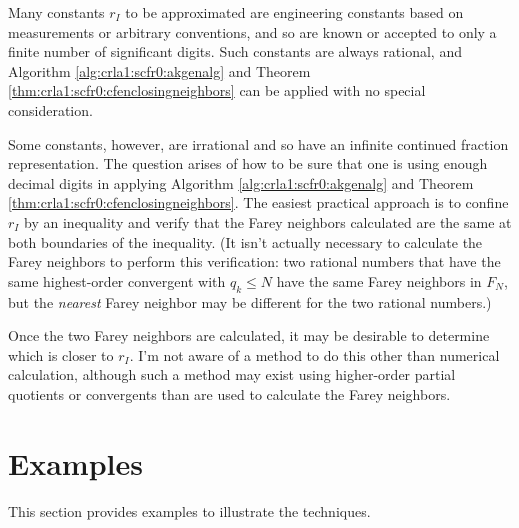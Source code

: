 Many constants $r_I$ to be approximated are engineering constants based on
measurements or arbitrary conventions, and so are known or accepted to
only a finite number of significant digits.  Such constants are always
rational, and Algorithm \ref{alg:crla1:scfr0:akgenalg} and Theorem
\ref{thm:crla1:scfr0:cfenclosingneighbors} can be applied with no special
consideration.

Some constants, however, are irrational and so have an infinite continued
fraction representation.  The question arises of how to be sure that one
is using enough decimal digits in applying Algorithm
\ref{alg:crla1:scfr0:akgenalg} and Theorem
\ref{thm:crla1:scfr0:cfenclosingneighbors}.  The easiest practical
approach is to confine $r_I$ by an inequality and verify that the Farey
neighbors calculated are the same at both boundaries of the inequality\@.
(It isn't actually necessary to calculate the Farey neighbors to perform
this verification: two rational numbers that have the same highest-order
convergent with $q_k \leq N$ have the same Farey neighbors in $F_N$, but
the \emph{nearest} Farey neighbor may be different for the two rational
numbers.)

Once the two Farey neighbors are calculated, it may be desirable to
determine which is closer to $r_I$.  I'm not aware of a method to do this
other than numerical calculation, although such a method may exist using
higher-order partial quotients or convergents than are used to calculate
the Farey neighbors.


\section{Examples}
\label{crla1:sxmp0}

This section provides examples to illustrate the techniques.

